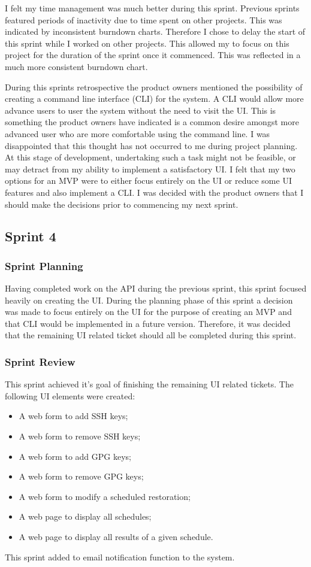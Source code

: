    I felt my time management was much better during this sprint. Previous sprints featured periods of inactivity due to time spent on other projects. This was indicated by inconsistent burndown charts. Therefore I chose to delay the start of this sprint while I worked on other projects. This allowed my to focus on this project for the duration of the sprint once it commenced. This was reflected in a much more consistent burndown chart.
   
   During this sprints retrospective the product owners mentioned the possibility of creating a command line interface (CLI) for the system. A CLI would allow more advance users to user the system without the need to visit the UI. This is something the product owners have indicated is a common desire amongst more advanced user who are more comfortable using the command line. I was disappointed that this thought has not occurred to me during project planning. At this stage of development, undertaking such a task might not be feasible, or may detract from my ability to implement a satisfactory UI. I felt that my two options for an MVP were to either focus entirely on the UI or reduce some UI features and also implement a CLI. I was decided with the product owners that I should make the decisions prior to commencing my next sprint.
   
   \subsection{Sprint 4}
   \subsubsection{Sprint Planning}
    Having completed work on the API during the previous sprint, this sprint focused heavily on creating the UI. During the planning phase of this sprint a decision was made to focus entirely on the UI for the purpose of creating an MVP and that CLI would be implemented in a future version. Therefore, it was decided that the remaining UI related ticket should all be completed during this sprint.
   
   \subsubsection{Sprint Review}
   This sprint achieved it's goal of finishing the remaining UI related tickets. The following UI elements were created:
   \begin{itemize}
     \item A web form to add SSH keys;
     \item A web form to remove SSH keys;
     \item A web form to add GPG keys;
     \item A web form to remove GPG keys;
     \item A web form to modify a scheduled restoration;
     \item A web page to display all schedules;
     \item A web page to display all results of a given schedule.
    \end{itemize}
    This sprint added to email notification function to the system.
    
